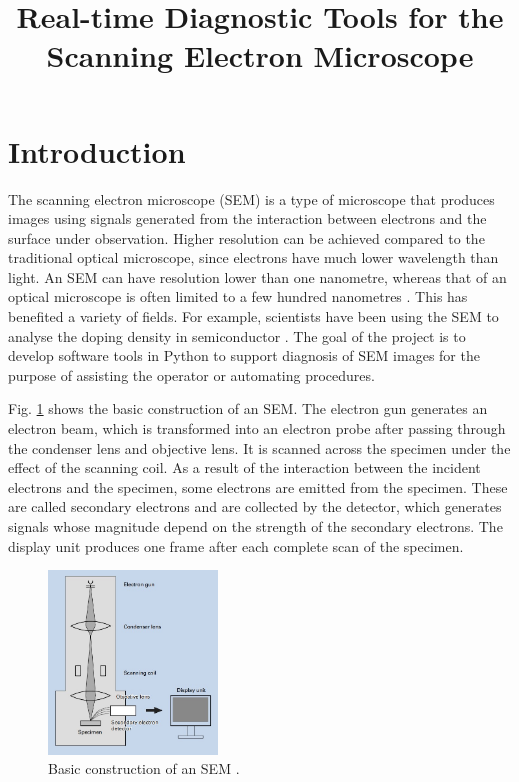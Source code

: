 \documentclass[conference]{IEEEtran}
\begin{document}
\title{Real-time Diagnostic Tools for the Scanning Electron Microscope}
\author{
}
\maketitle

\begin{abstract}
\end{abstract}

\section{Introduction}
The scanning electron microscope (SEM) is a type of microscope that produces images using signals generated from the interaction between electrons and the surface under observation. Higher resolution can be achieved compared to the traditional optical microscope, since electrons have much lower wavelength than light. An SEM can have resolution lower than one nanometre, whereas that of an optical microscope is often limited to a few hundred nanometres \cite{SEM wiki}. This has benefited a variety of fields. For example, scientists have been using the SEM to analyse the doping density in semiconductor \cite{SEM for semiconductor}. The goal of the project is to develop software tools in Python to support diagnosis of SEM images for the purpose of assisting the operator or automating procedures.

Fig. \ref{SEM basic construction} shows the basic construction of an SEM. The electron gun generates an electron beam, which is transformed into an electron probe after passing through the condenser lens and objective lens. It is scanned across the specimen under the effect of the scanning coil. As a result of the interaction between the incident electrons and the specimen, some electrons are emitted from the specimen. These are called secondary electrons and are collected by the detector, which generates signals whose magnitude depend on the strength of the secondary electrons. The display unit produces one frame after each complete scan of the specimen.

\begin{figure}[htbp]
    \centering
    \includegraphics[width=0.4\textwidth]{Images/SEM basic construction.jpg}
    \caption{Basic construction of an SEM \cite{SEM A to Z}.}
    \label{SEM basic construction}
\end{figure}
\end{document}
